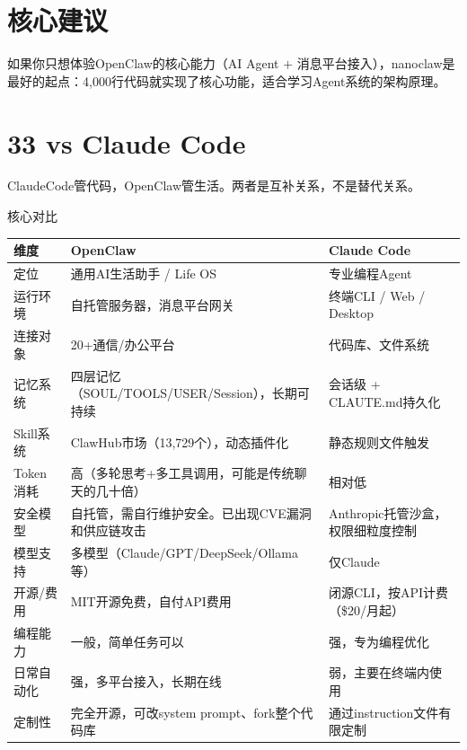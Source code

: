 \documentclass[
  10
]{article}
\newcounter{none} %
\begin{document}
\section{核心建议}\label{ux6838ux5fc3ux5efaux8bae-23}

如果你只想体验OpenClaw的核心能力（AI Agent \(+\)
消息平台接入），nanoclaw是最好的起点：4,000行代码就实现了核心功能，适合学习Agent系统的架构原理。

\section{33 vs Claude Code}\label{vs-claude-code}

ClaudeCode管代码，OpenClaw管生活。两者是互补关系，不是替代关系。

核心对比

{\def\LTcaptype{none} %
\begin{longtable}[]{@{}|l|l|l|@{}}
\toprule\noalign{}
\endhead
\bottomrule\noalign{}
\endlastfoot
\hline
维度 & OpenClaw & Claude Code \\
\hline
定位 & 通用AI生活助手 / Life OS & 专业编程Agent \\
\hline
运行环境 & 自托管服务器，消息平台网关 & 终端CLI / Web / Desktop \\
\hline
连接对象 & 20+通信/办公平台 & 代码库、文件系统 \\
\hline
记忆系统 & 四层记忆（SOUL/TOOLS/USER/Session），长期可持续 & 会话级 +
CLAUTE.md持久化 \\
\hline
Skill系统 & ClawHub市场（13,729个），动态插件化 & 静态规则文件触发 \\
\hline
Token消耗 & 高（多轮思考+多工具调用，可能是传统聊天的几十倍） &
相对低 \\
\hline
安全模型 & 自托管，需自行维护安全。已出现CVE漏洞和供应链攻击 &
Anthropic托管沙盒，权限细粒度控制 \\
\hline
模型支持 & 多模型（Claude/GPT/DeepSeek/Ollama等） & 仅Claude \\
\hline
开源/费用 & MIT开源免费，自付API费用 &
闭源CLI，按API计费（\$20/月起） \\
\hline
编程能力 & 一般，简单任务可以 & 强，专为编程优化 \\
\hline
日常自动化 & 强，多平台接入，长期在线 & 弱，主要在终端内使用 \\
\hline
定制性 & 完全开源，可改system prompt、fork整个代码库 &
通过instruction文件有限定制 \\
\hline
\end{longtable}
}
\end{document}
